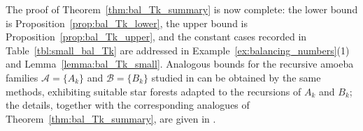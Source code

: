 The proof of Theorem~\ref{thm:bal_Tk_summary} is now complete: the lower bound is Proposition~\ref{prop:bal_Tk_lower}, the upper bound is Proposition~\ref{prop:bal_Tk_upper}, and the constant cases recorded in Table~\ref{tbl:small_bal_Tk} are addressed in Example~\ref{ex:balancing_numbers}(1) and Lemma~\ref{lemma:bal_Tk_small}.
Analogous bounds for the recursive amoeba families $\mathcal A=\{A_k\}$ and $\mathcal B=\{B_k\}$ studied in \cite{Eslavaetal2025} can be obtained by the same methods, exhibiting suitable star forests adapted to the recursions of $A_k$ and $B_k$; the details, together with the corresponding analogues of Theorem~\ref{thm:bal_Tk_summary}, are given in \cite[Theorem~15 and Propositions~20--22]{Eslavaetal2025}.
